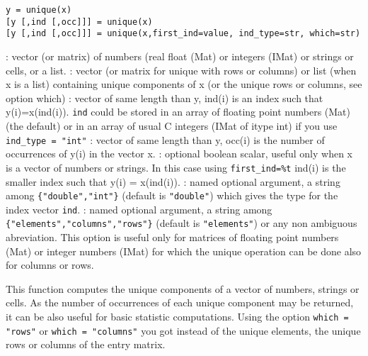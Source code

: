 
\begin{mandesc}
\end{mandesc}

\begin{calling_sequence}
\begin{verbatim}
y = unique(x)
[y [,ind [,occ]]] = unique(x)
[y [,ind [,occ]]] = unique(x,first_ind=value, ind_type=str, which=str)
\end{verbatim}
\end{calling_sequence}
\begin{parameters}
  \begin{varlist}
    : vector (or matrix) of numbers (real float (Mat) or integers (IMat) or strings 
               or cells, or a list.
    : vector (or matrix for unique with rows or columns) or list (when x is a list) containing 
               unique components of x (or the unique rows or columns, see option which)
    : vector of same length than y, ind(i) is an index
                 such that y(i)=x(ind(i)). \verb+ind+ could be stored in an array of
                 floating point numbers (Mat) (the default) or in an array of 
                 usual C integers (IMat of itype int) if you use \verb+ind_type = "int"+
    : vector of same length than y, occ(i) is the number
                 of occurrences of y(i) in the vector x.
    : optional boolean scalar, useful only when x is a vector
    of numbers or strings. In this case using \verb!first_ind=%t! ind(i) is
    the smaller index such that y(i) = x(ind(i)).
    : named optional argument, a string among \verb+{"double","int"}+ (default is \verb+"double"+)
    which gives the type for the index vector  \verb+ind+. 
    : named optional argument, a string among \verb+{"elements","columns","rows"}+ (default is
    \verb+"elements"+) or any non ambiguous abreviation. This option is useful only for matrices of floating 
       point numbers (Mat) or integer numbers (IMat) for which the unique operation can be done also for
       columns or rows.
  \end{varlist}
\end{parameters}

\begin{mandescription}
  This function computes the unique components of a vector of numbers,
  strings or cells. As the number of occurrences of each unique
  component may be returned, it can be also useful for basic statistic
  computations. Using the option \verb+which = "rows"+ or \verb+which = "columns"+ 
  you got instead of the unique elements, the unique rows or columns of the entry 
  matrix. 
\end{mandescription}


